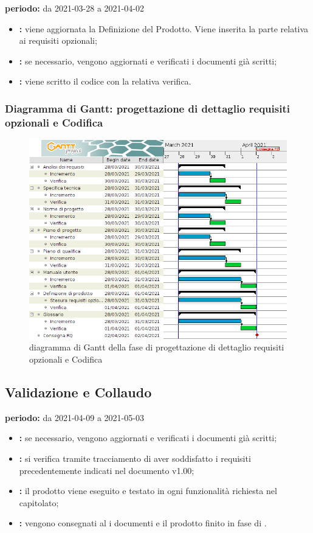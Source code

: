 	\textbf{periodo:} da 2021-03-28 a 2021-04-02   

	\begin{itemize}
		\item \textbf{:} viene aggiornata la Definizione del Prodotto. Viene inserita la parte relativa ai requisiti opzionali;
		\item \textbf{:} se necessario, vengono aggiornati e verificati i documenti già scritti;
		\item \textbf{:} viene scritto il codice con la relativa verifica.
	\end{itemize}  

	\subsubsection{Diagramma di Gantt: progettazione di dettaglio requisiti opzionali e Codifica}

		\begin{figure}[H]
			\centering
			\includegraphics[width=0.7\linewidth]{./res/images/Opzionali.png}
			\caption{diagramma di Gantt della fase di progettazione di dettaglio requisiti opzionali e Codifica}
			\label{fig:diagramma di Gantt della fase di progettazione di dettaglio requisiti opzionali e Codifica}
		\end{figure}
	

\subsection{Validazione e Collaudo}

	\textbf{periodo:} da 2021-04-09 a 2021-05-03     

	\begin{itemize}
		\item \textbf{:} se necessario, vengono aggiornati e verificati i documenti già scritti;
		\item \textbf{:} si verifica tramite tracciamento di aver soddisfatto i requisiti precedentemente indicati nel documento  v1.00;
		\item \textbf{:} il prodotto viene eseguito e testato in ogni funzionalità richiesta nel capitolato;	
		\item \textbf{:} vengono consegnati al  i documenti e il prodotto finito in fase di .
	\end{itemize}  

